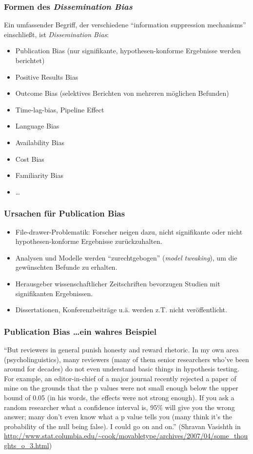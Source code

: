 \begin{frame}
  \frametitle{Formen des \emph{Dissemination Bias}}
  Ein umfassender Begriff, der verschiedene \enquote{information suppression
    mechanisms} einschließt, ist \emph{Dissemination Bias}:
  \begin{itemize}
  \item Publication Bias (nur signifikante, hypothesen-konforme Ergebnisse werden berichtet)
  \item Positive Results Bias
  \item Outcome Bias (selektives Berichten von mehreren möglichen Befunden)
  \item Time-lag-bias, Pipeline Effect
  \item Language Bias
  \item Availability Bias
  \item Cost Bias
  \item Familiarity Bias
  \item \ldots
  \end{itemize}
\end{frame}



\begin{frame}
  \frametitle{Ursachen für Publication Bias}
  \begin{itemize}
  \item File-drawer-Problematik: Forscher neigen dazu, nicht signifikante oder
    nicht hypothesen-konforme Ergebnisse zurückzuhalten.
  \item Analysen und Modelle werden \enquote{zurechtgebogen} (\emph{model
      tweaking}), um die gewünschten Befunde zu erhalten.
  \item Herausgeber wissenschaftlicher Zeitschriften bevorzugen Studien mit
    signifikanten Ergebnissen.
  \item Dissertationen, Konferenzbeiträge u.ä. werden z.T. nicht veröffentlicht.
  \end{itemize}

  \citep[Für eine theoretische Erörterung möglicher Motive siehe auch][]{auspurg_what_2011}
\end{frame}


\begin{frame}
  \frametitle{Publication Bias \ldots ein wahres Beispiel} "`But reviewers in
  general punish honesty and reward rhetoric. In my own area
  (psycholinguistics), many reviewers (many of them senior researchers who've
  been around for decades) do not even understand basic things in hypothesis
  testing. For example, \alert{an editor-in-chief of a major journal recently
    rejected a paper of mine on the grounds that the p values were not small
    enough below the upper bound of 0.05 (in his words, \glq the effects were
    not strong enough\grq).} If you ask a random researcher what a confidence
  interval is, 95\% will give you the wrong answer; many don't even know what a
  p value tells you (many think it's the probability of the null being false). I
  could go on and on."'  (Shravan Vasishth in
  \url{http://www.stat.columbia.edu/\~cook/movabletype/archives/2007/04/some\_thoughts\_o\_3.html})
\end{frame}


